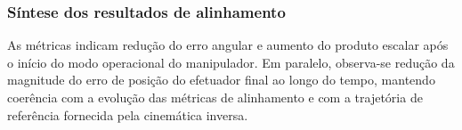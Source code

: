 \subsubsection{Síntese dos resultados de alinhamento}
\label{subsubsec:cap4_alinhamento_sintese}

As métricas indicam redução do erro angular e aumento do produto escalar após o início do modo operacional do manipulador.
Em paralelo, observa-se redução da magnitude do erro de posição do efetuador final ao longo do tempo, mantendo coerência com a evolução das métricas de alinhamento e com a trajetória de referência fornecida pela cinemática inversa.